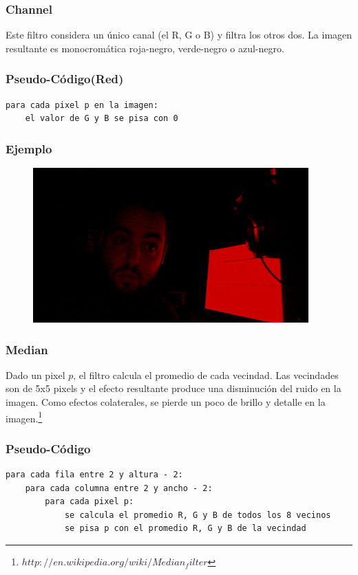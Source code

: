 \subsubsection{Channel}

Este filtro considera un \'unico canal (el R, G o B) y filtra los otros dos. La imagen resultante es monocrom\'atica roja-negro, verde-negro o azul-negro.
\subsubsection*{Pseudo-C\'odigo(Red)}
\begin{verbatim}
para cada pixel p en la imagen:
    el valor de G y B se pisa con 0   
\end{verbatim}

\subsubsection*{Ejemplo}
\begin{center}
  \begin{figure}[H]
  \includegraphics[scale=0.60]{imgs/chan.png}
  \end{figure}  
\end{center}  

\subsubsection{Median}

Dado un pixel $p$, el filtro calcula el promedio de cada vecindad. Las vecindades son de 5x5 pixels y el efecto resultante produce una disminuci\'on del ruido en la imagen. Como efectos colaterales, se pierde un poco de brillo y detalle en la imagen.\footnote{$http://en.wikipedia.org/wiki/Median_filter$}
\subsubsection*{Pseudo-C\'odigo}
\begin{verbatim}
para cada fila entre 2 y altura - 2:
    para cada columna entre 2 y ancho - 2:
        para cada pixel p:
            se calcula el promedio R, G y B de todos los 8 vecinos
            se pisa p con el promedio R, G y B de la vecindad
\end{verbatim}

